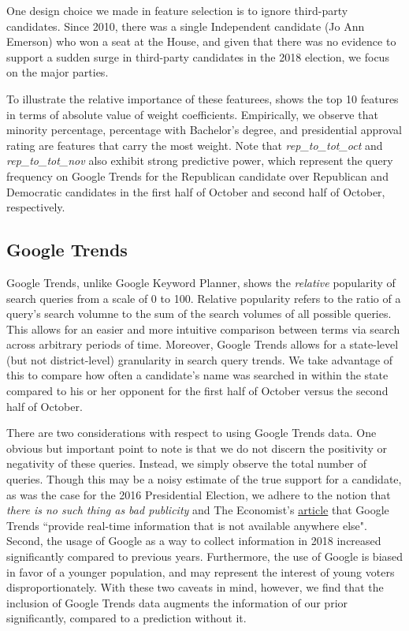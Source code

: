 \documentclass[12pt, letterpaper]{article}
\begin{document}
One design choice we made in feature selection is to ignore third-party candidates. Since 2010, there was a single Independent candidate (Jo Ann Emerson) who won a seat at the House, and given that there was no evidence to support a sudden surge in third-party candidates in the 2018 election, we focus on the major parties.

To illustrate the relative importance of these featurees,  shows the top 10
features in terms of absolute value of weight coefficients. Empirically, we observe that minority percentage, percentage with Bachelor's degree, and presidential approval rating are features that carry the most weight. Note that \textit{rep\_to\_tot\_oct} and \textit{rep\_to\_tot\_nov} also exhibit strong predictive power, which represent the query frequency on Google Trends for the Republican candidate over Republican and Democratic candidates in the first half of October and second half of October, respectively.

\subsection{Google Trends}
Google Trends, unlike Google Keyword Planner, shows the \textit{relative} popularity of search queries from a scale of 0 to 100. Relative popularity refers to the ratio of a query's search volumne to the sum of the search volumes of all possible queries. This allows for an easier and more intuitive comparison between terms via search across arbitrary periods of time. Moreover, Google Trends allows for a state-level (but not district-level) granularity in search query trends. We take advantage of this to compare how often a candidate's name was searched in within the state compared to his or her opponent for the first half of October versus the second half of October.

There are two considerations with respect to using Google Trends data. One
obvious but important point to note is that we do not discern the positivity or
negativity of these queries. Instead, we simply observe the total number of
queries. Though this may be a noisy estimate of the true support for a
candidate, as was the case for the 2016 Presidential Election, we adhere to the
notion that \textit{there is no such thing as bad publicity} \citep{berger2010positive} and The Economist's
\href{https://www.economist.com/graphic-detail/2016/03/01/how-useful-is-google-search-data-when-predicting-primary-elections}{article} that Google Trends ``provide real-time information that is not available
anywhere else". Second, the usage of Google as a way to collect information in 2018 increased significantly compared to previous years. Furthermore, the use of Google is biased in favor of a younger population, and may represent the interest of young voters disproportionately. With these two caveats in mind, however, we find that the inclusion of Google Trends data augments the information of our prior significantly, compared to a prediction without it.
\end{document}
